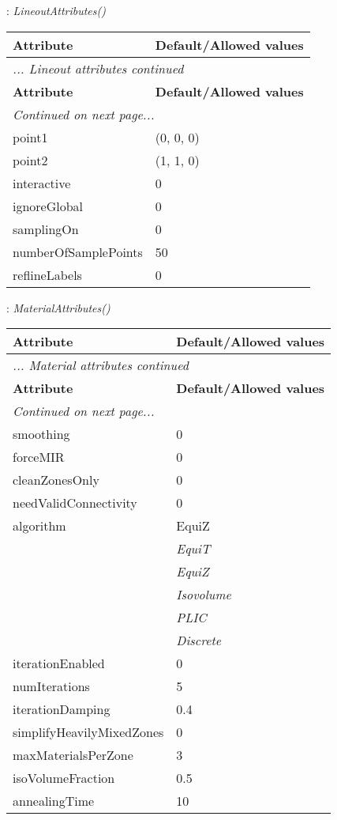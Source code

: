 \documentclass[10pt,a4paper]{report}
\begin{document}
\newpage

{}
: {\it LineoutAttributes() }\\[-3mm]

\begin{longtable}{ll}
{\bf Attribute} & {\bf Default/Allowed values} \\
\hline \hline
\endfirsthead
\multicolumn{2}{l}{{\it ... Lineout attributes continued}} \\
{\bf Attribute} & {\bf Default/Allowed values} \\
\hline \hline
\endhead
\hline
\multicolumn{2}{l}{{\it Continued on next page...}} \\
\endfoot
\hline
\endlastfoot

point1  &  (0, 0, 0) \\
point2  &  (1, 1, 0) \\
interactive  &  0 \\
ignoreGlobal  &  0 \\
samplingOn  &  0 \\
numberOfSamplePoints  &  50 \\
reflineLabels  &  0 \\
\end{longtable}

\newpage

{}
: {\it MaterialAttributes() }\\[-3mm]

\begin{longtable}{ll}
{\bf Attribute} & {\bf Default/Allowed values} \\
\hline \hline
\endfirsthead
\multicolumn{2}{l}{{\it ... Material attributes continued}} \\
{\bf Attribute} & {\bf Default/Allowed values} \\
\hline \hline
\endhead
\hline
\multicolumn{2}{l}{{\it Continued on next page...}} \\
\endfoot
\hline
\endlastfoot

smoothing  &  0 \\
forceMIR  &  0 \\
cleanZonesOnly  &  0 \\
needValidConnectivity  &  0 \\
algorithm  &  EquiZ   \\
 & {\it  EquiT} \\
 & {\it  EquiZ} \\
 & {\it  Isovolume} \\
 & {\it  PLIC} \\
 & {\it  Discrete} \\
iterationEnabled  &  0 \\
numIterations  &  5 \\
iterationDamping  &  0.4 \\
simplifyHeavilyMixedZones  &  0 \\
maxMaterialsPerZone  &  3 \\
isoVolumeFraction  &  0.5 \\
annealingTime  &  10 \\
\end{longtable}
\end{document}
